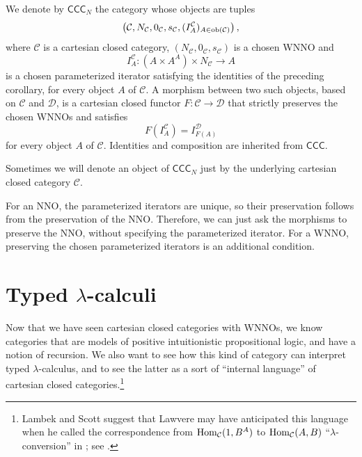 \begin{definition}\label{idx:ccc-n}
    We denote by $\mathsf{CCC}_N$ the category whose objects are tuples
    \[ \left(\mathcal C,N_{\mathcal C},0_{\mathcal C},s_{\mathcal C},(I_A^{\mathcal C})_{A \in \operatorname{ob}(\mathcal C)}\right), \]
    where $\mathcal C$ is a cartesian closed category, $(N_{\mathcal C},0_{\mathcal C},s_{\mathcal C})$ is a chosen WNNO and
    \[ I_A^{\mathcal C} : (A \times A^A) \times N_{\mathcal C} \to A \]
    is a chosen parameterized iterator satisfying the identities of the preceding corollary, for every object $A$ of $\mathcal C$.
    A morphism between two such objects, based on $\mathcal C$ and $\mathcal D$, is a cartesian closed functor $F : \mathcal C \to \mathcal D$ that strictly preserves the chosen WNNOs and satisfies
    \[ F(I_A^{\mathcal C}) = I_{F(A)}^{\mathcal D} \]
    for every object $A$ of $\mathcal C$. Identities and composition are inherited from $\mathsf{CCC}$.
\end{definition}

\begin{notation}
    Sometimes we will denote an object of $\mathsf{CCC}_N$ just by the underlying cartesian closed category $\mathcal C$.
\end{notation}

\begin{remark}
    For an NNO, the parameterized iterators are unique, so their preservation follows from the preservation of the NNO. Therefore, we can just ask the morphisms to preserve the NNO, without specifying the parameterized iterator. For a WNNO, preserving the chosen parameterized iterators is an additional condition.
\end{remark}

\section{Typed \texorpdfstring{$\lambda$}{lambda}-calculi}
Now that we have seen cartesian closed categories with WNNOs, we know categories that are models of positive intuitionistic propositional
logic, and have a notion of recursion. We also want to see how this kind of category can interpret typed $\lambda$-calculus,
and to see the latter as a sort of “internal language” of cartesian closed categories.\footnote{Lambek and Scott suggest that Lawvere may have anticipated this language when he called the correspondence from $\operatorname{Hom}_{\mathcal C}(1,B^A)$ to $\operatorname{Hom}_{\mathcal C}(A,B)$ “$\lambda$-conversion” in \cite[p.~139]{Lawvere1969}; see \cite[\S~10, p.~116]{LambekScott1994}.}

